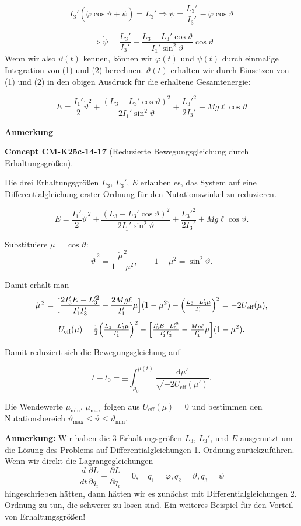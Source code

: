 \documentclass[10pt, letterpaper]{article}
\newcommand{\CustomHeading}[3]{%
  \par\medskip\noindent%
  \textbf{#1 #2} \textnormal{(#3)}.\enskip%
}
\newenvironment{CONC}[2]{\begin{unitbox}\CustomHeading{Concept}{#1}{#2}}{\end{unitbox}}
\begin{document}
\[I_3'(\dot{\varphi}\cos\vartheta + \dot{\psi}) = L_3' \Rightarrow \dot{\psi} = \frac{L_3'}{I_3'} - \dot{\varphi}\cos\vartheta\]

\[\Rightarrow \dot{\psi} = \frac{L_3'}{I_3'} - \frac{L_3 - L_3'\cos\vartheta}{I_1'\sin^2\vartheta}\cos\vartheta \tag{2}\]
Wenn wir also $\vartheta(t)$ kennen, können wir $\varphi(t)$ und $\psi(t)$ durch einmalige Integration von (1) und (2) berechnen. $\vartheta(t)$ erhalten wir durch Einsetzen von (1) und (2) in den obigen Ausdruck für die erhaltene Gesamtenergie:

\[
E = \frac{I_1'}{2}\dot{\vartheta}^2 + \frac{(L_3-L_3'\cos\vartheta)^2}{2I_1'\sin^2\vartheta} + \frac{L_3'^2}{2I_3'} + Mg\ell\cos\vartheta \tag{3}
\]



\textbf{Anmerkung}  


\begin{CONC}{CM-K25c-14-17}{Reduzierte Bewegungsgleichung durch Erhaltungsgrößen}
Die drei Erhaltungsgrößen $L_3$, $L_3'$, $E$ erlauben es, das System auf eine Differentialgleichung erster Ordnung für den Nutationswinkel zu reduzieren.  

\[
E=\frac{I_1'}{2}\dot{\vartheta}^{\,2}
   +\frac{(L_3-L_3'\cos\vartheta)^{2}}{2I_1'\sin^{2}\vartheta}
   +\frac{L_3'^{2}}{2I_3'}+Mg\ell\cos\vartheta .
\]

Substituiere $\mu=\cos\vartheta$:
\[
\dot{\vartheta}^{\,2}
  =\frac{\dot{\mu}^{\,2}}{1-\mu^{2}},\qquad
1-\mu^{2}=\sin^{2}\vartheta .
\]

Damit erhält man
\[
\dot{\mu}^{\,2}
 =\Bigl[\frac{2I_3'E-L_3'^{2}}{I_1'I_3'}-\frac{2Mg\ell}{I_1'}\mu\Bigr](1-\mu^{2})
   -\Bigl(\tfrac{L_3-L_3'\mu}{I_1'}\Bigr)^{2}
 =-2U_{\text{eff}}(\mu),
\]
\[
U_{\text{eff}}(\mu)
  =\tfrac12\Bigl(\tfrac{L_3-L_3'\mu}{I_1'}\Bigr)^{2}
   -\Bigl[\tfrac{I_3'E-L_3'^{2}}{I_1'I_3'}
          -\tfrac{Mg\ell}{I_1'}\mu\Bigr](1-\mu^{2}).
\]

Damit reduziert sich die Bewegungsgleichung auf

\[
t-t_0
  =\pm\!\int_{\mu_0}^{\mu(t)}
       \frac{\mathrm d\mu'}
            {\sqrt{-2U_{\text{eff}}(\mu')}} .
\]

Die Wendewerte $\mu_{\min}$, $\mu_{\max}$ folgen aus $U_{\text{eff}}(\mu)=0$ und bestimmen den Nutationsbereich $\vartheta_{\max}\le\vartheta\le\vartheta_{\min}$.
\end{CONC}




\textbf{Anmerkung:} Wir haben die 3 Erhaltungsgrößen $L_3$, $L_3'$, und $E$ ausgenutzt um die Lösung des Problems auf Differentialgleichungen 1. Ordnung zurückzuführen. Wenn wir direkt die Lagrangegleichungen
\[
\frac{d}{dt}\frac{\partial L}{\partial \dot{q_i}} - \frac{\partial L}{\partial q_i} = 0, \quad q_1=\varphi, q_2=\vartheta, q_3=\psi
\]
hingeschrieben hätten, dann hätten wir es zunächst mit Differentialgleichungen 2. Ordnung zu tun, die schwerer zu lösen sind. Ein weiteres Beispiel für den Vorteil von Erhaltungsgrößen!
\end{document}
